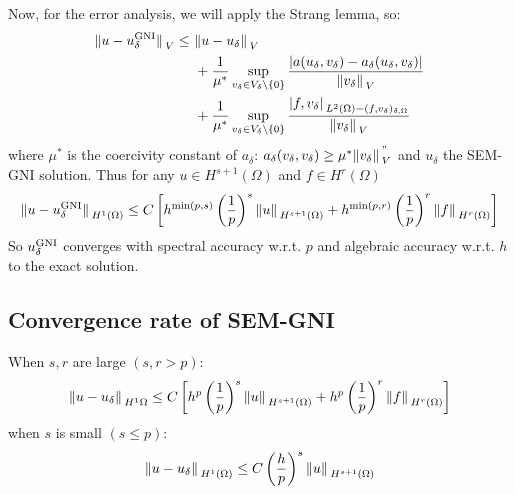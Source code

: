 Now, for the error analysis, we will apply the Strang lemma, so:
\begin{align*}
    \norm*{u- u _\delta^{\text{GNI}}}_V \leq \ & \norm*{u-u_\delta}_V \\
    & + \frac{1}{\mu^*} \sup_{v_\delta \in V_\delta \backslash\left\{ 0 \right\}} \frac{\abs{a(u_\delta, v_\delta) - a_\delta(u_\delta, v_\delta)}}{\norm*{v_\delta}_V} \\
    & + \frac{1}{\mu^*} \sup_{v_\delta \in V_\delta \backslash\left\{ 0 \right\}} \frac{\abs*{f,v_\delta}_{L^2(\Omega) - (f,v_\delta)_{\delta,\Omega}}}{\norm*{v_\delta}_V}
\end{align*}
where \(\mu^*\) is the coercivity constant of \(a_\delta\): \(a_\delta(v_\delta, v_\delta) \geq \mu^*\norm*{v_\delta}^"_V\) and \(u_\delta\) the SEM-GNI solution.
Thus for any \(u \in H^{s+1}(\Omega)\) and \(f \in H^r(\Omega)\) 
\[
    \norm*{u-u_\delta^{\text{GNI}}}_{H^1(\Omega)} \leq C\left[ h^{\min(p,s)}\left( \frac{1}{p} \right)^s \norm*{u}_{H^{s+1}(\Omega)} + h^{\min(p,r)}\left( \frac{1}{p} \right)^r \norm*{f}_{H^{r}(\Omega)}  \right]
\]
So \(u_\delta^{\text{GNI}}\) converges with spectral accuracy w.r.t. \(p\) and algebraic accuracy w.r.t. \(h\) to the exact solution.
\subsection{Convergence rate of SEM-GNI}
When \(s,r\) are large \((s, r > p)\):
\[
    \norm*{u-u_\delta}_{H^1{\Omega}} \leq C \left[ h^p \left(\frac{1}{p}\right)^s \norm*{u}_{H^{s+1}(\Omega)} + h^p \left(\frac{1}{p}\right)^r \norm*{f}_{H^{r}(\Omega)}  \right]
\]
when \(s\) is small \((s \leq p)\):
\[
    \norm*{u-u_\delta}_{H^1(\Omega)} \leq C\left( \frac{h}{p} \right)^s \norm*{u}_{H^{s+1}(\Omega)}
\]